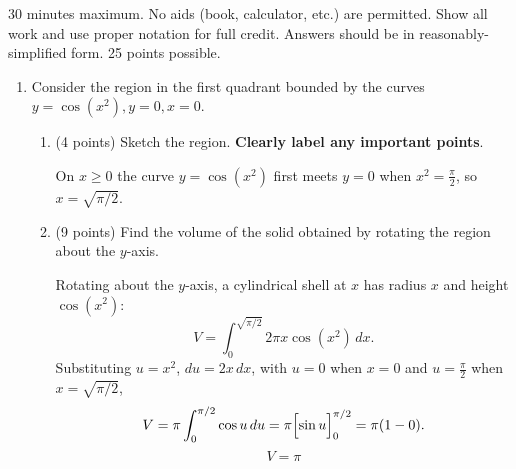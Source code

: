 \documentclass[12pt]{article}
\newcommand{\ds}{\displaystyle}
\begin{document}
30 minutes maximum.  No aids (book, calculator, etc.) are permitted.
Show all work and use proper notation for full credit.  Answers should
be in reasonably-simplified form.  25 points possible.

\begin{enumerate}
\item Consider the region in the first quadrant bounded by the curves $\ds
  y=\cos\left(x^2\right), y=0, x=0$.
  
\begin{enumerate}
\item (4 points) Sketch the region. {\bf Clearly label any important points}.

\begin{solution}
On $x\ge 0$ the curve $y=\cos\left(x^2\right)$ first meets $y=0$ when $x^2=\frac{\pi}{2}$, so $x=\sqrt{\pi/2}$.
\begin{center}
\end{center}
\end{solution}

\item (9 points) Find the volume of the solid
  obtained by rotating the region about the $y$-axis.

\begin{solution}
Rotating about the $y$-axis, a cylindrical shell at $x$ has radius $x$ and height $\cos\left(x^2\right)$:
\[
V=\int_0^{\sqrt{\pi/2}} 2\pi x\cos\left(x^2\right)\,dx .
\]
Substituting $u=x^2$, $du=2x\,dx$, with $u=0$ when $x=0$ and $u=\frac{\pi}{2}$ when $x=\sqrt{\pi/2}$,
\[
V=\pi\int_0^{\pi/2}\cos u\,du=\pi\Bigl[\sin u\Bigr]_0^{\pi/2}=\pi(1-0).
\]
\[
\boxed{\ V=\pi\ }
\]
\end{solution}
  \end{enumerate}


\end{enumerate}
\end{document}
